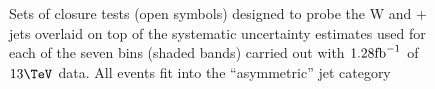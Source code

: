 \begin{figure}[h!]
  \begin{center}
     ~~
     \\
     ~~
     \\
    \caption{Sets of closure tests (open symbols) designed to probe
      the W and \ttbar + jets overlaid on top of
      the systematic uncertainty estimates used for each of the seven
      \scalht bins (shaded bands) carried out with $1.28\text{fb}^{-1}$ of
      $13\tev$ data. All events fit into the ``asymmetric'' jet
      category}
    \label{fig:ttWclosureDataAsym}
  \end{center} 
\end{figure}

